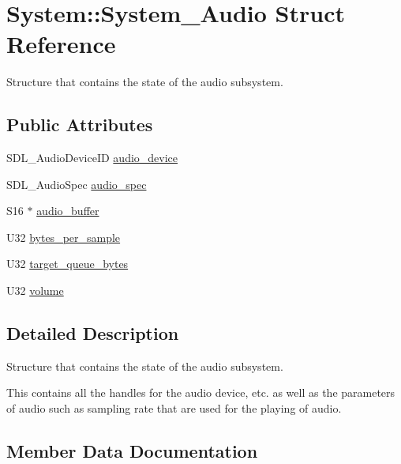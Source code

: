 \hypertarget{structSystem_1_1System__Audio}{}\section{System\+::System\+\_\+\+Audio Struct Reference}
\label{structSystem_1_1System__Audio}


Structure that contains the state of the audio subsystem.  


\subsection*{Public Attributes}
\begin{DoxyCompactItemize}
\item 
S\+D\+L\+\_\+\+Audio\+Device\+ID \mbox{\hyperlink{structSystem_1_1System__Audio_a5fd57aaf9c13e4cbc7912cf453881874}{audio\+\_\+device}}
\item 
S\+D\+L\+\_\+\+Audio\+Spec \mbox{\hyperlink{structSystem_1_1System__Audio_ae933f9705975468958251db45a310ab4}{audio\+\_\+spec}}
\item 
S16 $\ast$ \mbox{\hyperlink{structSystem_1_1System__Audio_a7a94925579c2412fd259b8d73e4c90f4}{audio\+\_\+buffer}}
\item 
U32 \mbox{\hyperlink{structSystem_1_1System__Audio_adac90b1a0e62afd66ea2967a0b5a234d}{bytes\+\_\+per\+\_\+sample}}
\item 
U32 \mbox{\hyperlink{structSystem_1_1System__Audio_a6e606e2379d0c5f83e931542f4c0bad3}{target\+\_\+queue\+\_\+bytes}}
\item 
U32 \mbox{\hyperlink{structSystem_1_1System__Audio_ab8696100d5f38507ff5e91b7194747ca}{volume}}
\end{DoxyCompactItemize}


\subsection{Detailed Description}
Structure that contains the state of the audio subsystem. 

This contains all the handles for the audio device, etc. as well as the parameters of audio such as sampling rate that are used for the playing of audio. 

\subsection{Member Data Documentation}
\mbox{\label{structSystem_1_1System__Audio_a7a94925579c2412fd259b8d73e4c90f4}} 
